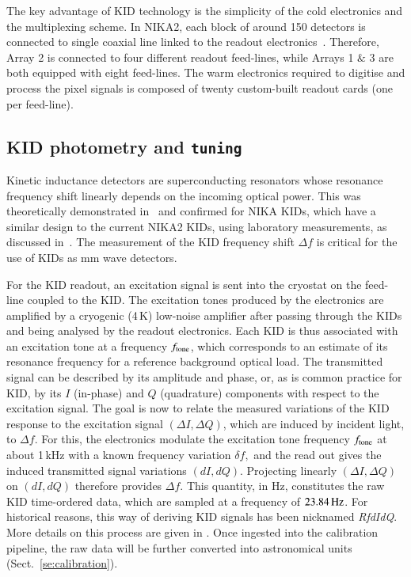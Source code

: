 \documentclass[traditionalabstract]{aa}
\newcommand{\lp}[1]{#1}
\begin{document}
The key advantage of KID technology is the simplicity of the cold
electronics and the multiplexing scheme. In NIKA2, each block of around 150
detectors is connected to single coaxial line linked to the readout
electronics~\citep{Bourrion2016}. {\lp Therefore, Array 2 is connected to four
different readout feed-lines, while Arrays 1 $\&  $ 3 are both equipped with eight
feed-lines.}
The warm electronics required to digitise
and process the pixel signals is composed of twenty custom-built readout
cards (one per feed-line).

\subsection{KID photometry and {\tt tuning}}
\label{se:tuning}

Kinetic inductance detectors are superconducting resonators whose resonance
frequency shift linearly depends on the incoming optical power.
{\lp This was theoretically demonstrated in~\citet{Swenson2010} and
confirmed for NIKA KIDs, which have a similar design to the current
NIKA2 KIDs, using laboratory measurements, as discussed
in~\citet{Monfardini2014JLTP}.}
The measurement of the KID frequency shift $\Delta f$ is critical for the use of
KIDs as mm wave detectors. 

For the KID readout, an excitation signal is sent into the cryostat on the
feed-line coupled to the KID.
The excitation tones produced by the electronics are amplified by a
cryogenic (4\,K) low-noise amplifier after passing through the KIDs and
being analysed by the readout electronics. {\lp Each KID is thus
associated with an excitation tone at a frequency $f_{\rm{tone}}$, which
corresponds to an estimate of its resonance frequency for a reference
background optical load.}
The transmitted signal can be described by its
amplitude and phase, or, as is common practice for KID, by its $I$
(in-phase) and $Q$ (quadrature) components
with respect to the excitation signal.
The goal is now to relate the measured variations of the KID response
to the excitation signal $(\Delta I, \Delta Q)$, which are induced by incident light, to
$\Delta f$. For this, the electronics modulate the excitation tone
frequency $f_{\rm{tone}}$ at about 1\,kHz with a known frequency variation $\delta f,$
and the read out gives the induced transmitted signal variations
$(dI, dQ)$. Projecting linearly $(\Delta I, \Delta Q)$ on $(dI, dQ)$ therefore
provides $\Delta f$. This quantity, in Hz, constitutes the raw KID
time-ordered data, which are sampled at a frequency of
$23.84\,\rm{Hz}$. For historical reasons, this way of deriving KID
signals has been nicknamed \emph{RfdIdQ}. More details on this process
are given in \citet{Calvo2013}.
Once ingested into the calibration pipeline, the raw data will be further converted
into astronomical units (Sect.~\ref{se:calibration}).\\
\end{document}

